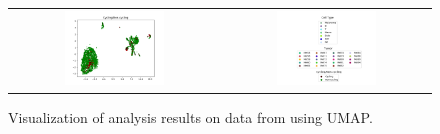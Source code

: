 \begin{figure}[!htb]
\begin{tabular}{cc}
    \includegraphics[width=0.5\textwidth]{images/tumap_cycling.png} &
    \includegraphics[width=0.5\textwidth]{images/tirosh_all_legends.png} \\
  \end{tabular}
  \caption{Visualization of analysis results on data from \cite{tirosh} using UMAP.}
  \label{fig:tirosh_umap}
\end{figure}

